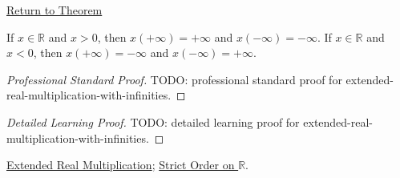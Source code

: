 \newpage
{}
\label{prf:extended-real-multiplication-with-infinities}
\begin{remark*}[Return]
\hyperref[thm:extended-real-multiplication-with-infinities]{Return to Theorem}
\end{remark*}
\begin{theorem*}
If $x\in\mathbb{R}$ and $x>0$, then $x(+\infty)=+\infty$ and
$x(-\infty)=-\infty$. If $x\in\mathbb{R}$ and $x<0$, then
$x(+\infty)=-\infty$ and $x(-\infty)=+\infty$.
\end{theorem*}
\begin{proof}[Professional Standard Proof]
\LRAProofBodyStart
TODO: professional standard proof for extended-real-multiplication-with-infinities.
\end{proof}
\begin{proof}[Detailed Learning Proof]
\LRAProofBodyStart
TODO: detailed learning proof for extended-real-multiplication-with-infinities.
\end{proof}
\begin{remark*}
\end{remark*}
\begin{dependencies}
\hyperref[def:extended-real-multiplication]{Extended Real Multiplication};
\hyperref[def:strict-order-on-r]{Strict Order on $\mathbb{R}$}.
\end{dependencies}
\clearpage
